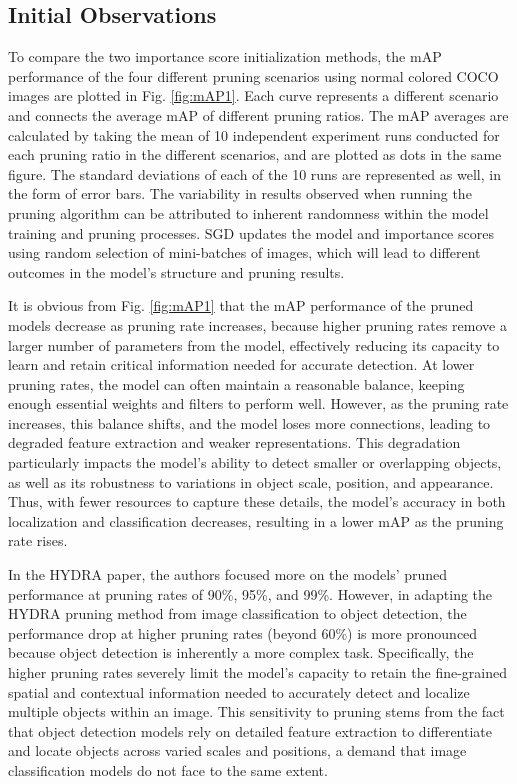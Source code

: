 \documentclass[journal,onecolumn,12pt]{IEEEtran}
\begin{document}
\subsection{Initial Observations}
To compare the two importance score initialization methods, the mAP performance of the four different pruning scenarios using normal colored COCO images are plotted in Fig. \ref{fig:mAP1}. Each curve represents a different scenario and connects the average mAP of different pruning ratios. The mAP averages are calculated by taking the mean of 10 independent experiment runs conducted for each pruning ratio in the different scenarios, and are plotted as dots in the same figure. The standard deviations of each of the 10 runs are represented as well, in the form of error bars. The variability in results observed when running the pruning algorithm can be attributed to inherent randomness within the model training and pruning processes. SGD updates the model and importance scores using random selection of mini-batches of images, which will lead to different outcomes in the model's structure and pruning results.

It is obvious from Fig. \ref{fig:mAP1} that the mAP performance of the pruned models decrease as pruning rate increases, because higher pruning rates remove a larger number of parameters from the model, effectively reducing its capacity to learn and retain critical information needed for accurate detection. At lower pruning rates, the model can often maintain a reasonable balance, keeping enough essential weights and filters to perform well. However, as the pruning rate increases, this balance shifts, and the model loses more connections, leading to degraded feature extraction and weaker representations. This degradation particularly impacts the model’s ability to detect smaller or overlapping objects, as well as its robustness to variations in object scale, position, and appearance. Thus, with fewer resources to capture these details, the model’s accuracy in both localization and classification decreases, resulting in a lower mAP as the pruning rate rises.

In the HYDRA paper, the authors focused more on the models' pruned performance at pruning rates of 90\%, 95\%, and 99\%. However, in adapting the HYDRA pruning method from image classification to object detection, the performance drop at higher pruning rates (beyond 60\%) is more pronounced because object detection is inherently a more complex task. Specifically, the higher pruning rates severely limit the model's capacity to retain the fine-grained spatial and contextual information needed to accurately detect and localize multiple objects within an image. This sensitivity to pruning stems from the fact that object detection models rely on detailed feature extraction to differentiate and locate objects across varied scales and positions, a demand that image classification models do not face to the same extent. 
\end{document}
